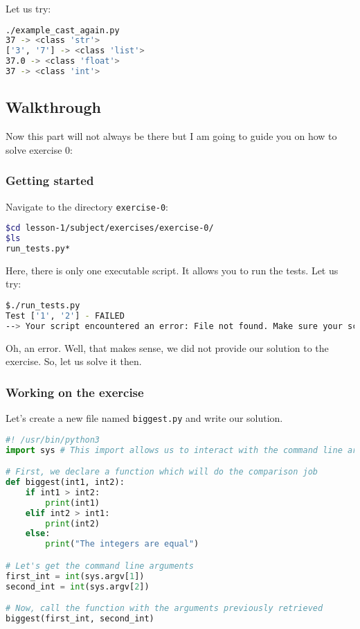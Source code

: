 \documentclass[12pt]{article}
\begin{document}
Let us try:

\begin{lstlisting}[language=bash]
./example_cast_again.py 
37 -> <class 'str'>
['3', '7'] -> <class 'list'>
37.0 -> <class 'float'>
37 -> <class 'int'>
\end{lstlisting}


\subsection{Walkthrough}

Now this part will not always be there but I am going to guide you on how to solve exercise 0:

\subsubsection{Getting started}
Navigate to the directory \texttt{exercise-0}:

\begin{lstlisting}[language=bash]
$cd lesson-1/subject/exercises/exercise-0/
$ls
run_tests.py*
\end{lstlisting}

Here, there is only one executable script. It allows you to run the tests. Let us try:

\begin{lstlisting}[language=bash]
$./run_tests.py 
Test ['1', '2'] - FAILED
--> Your script encountered an error: File not found. Make sure your script is correctly named
\end{lstlisting}

Oh, an error. Well, that makes sense, we did not provide our solution to the exercise. So, let us solve it then.

\subsubsection{Working on the exercise}

Let's create a new file named \texttt{biggest.py} and write our solution.

\begin{lstlisting}[language=python,style=codestyle,title=biggest.py]
#! /usr/bin/python3
import sys # This import allows us to interact with the command line arguments

# First, we declare a function which will do the comparison job
def biggest(int1, int2):
    if int1 > int2:
        print(int1)
    elif int2 > int1:
        print(int2)
    else:
        print("The integers are equal")

# Let's get the command line arguments
first_int = int(sys.argv[1])
second_int = int(sys.argv[2])

# Now, call the function with the arguments previously retrieved
biggest(first_int, second_int)
\end{lstlisting}
\end{document}
